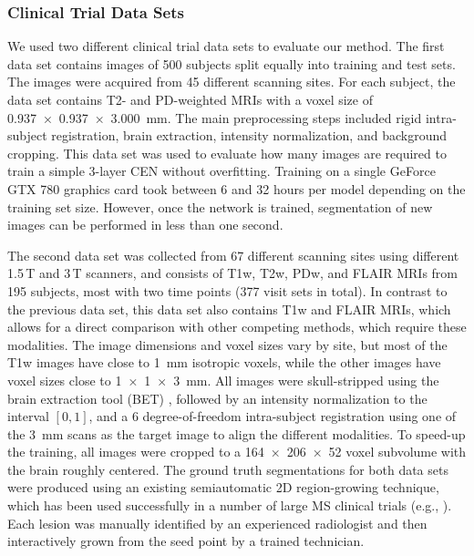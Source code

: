 \subsubsection{Clinical Trial Data Sets}

We used two different clinical trial data sets to evaluate our method. The first
data set contains images of 500 subjects split equally into training and test
sets. The images were acquired from 45 different scanning sites. For each
subject, the data set contains T2- and PD-weighted MRIs with a voxel size of
\SI{0.937x0.937x3.000}{\milli\metre}. The main preprocessing steps included
rigid intra-subject registration, brain extraction, intensity normalization, and
background cropping. This data set was used to evaluate how many images are
required to train a simple 3-layer CEN without overfitting. Training on a
single GeForce GTX 780 graphics card took between 6 and 32 hours per model
depending on the training set size. However, once the network is trained,
segmentation of new images can be performed in less than one second.

The second data set was collected from 67 different scanning sites using
different 1.5\,T and 3\,T scanners, and consists of T1w, T2w, PDw, and FLAIR
MRIs from 195 subjects, most with two time points (377 visit sets in total). In
contrast to the previous data set, this data set also contains T1w and FLAIR
MRIs, which allows for a direct comparison with other competing methods, which
require these modalities. The image dimensions and voxel sizes vary by site, but
most of the T1w images have close to \SI{1}{\milli\meter} isotropic voxels,
while the other images have voxel sizes close to \SI{1x1x3}{\milli\meter}. All
images were skull-stripped using the brain extraction tool (BET)
\citep{jenkinson2005bet2}, followed by an intensity normalization to the
interval $[0,1]$, and a 6 degree-of-freedom intra-subject registration using one
of the \SI{3}{\milli\meter} scans as the target image to align the different
modalities. To speed-up the training, all images were cropped to a
\num{164x206x52} voxel subvolume with the brain roughly centered. The ground
truth segmentations for both data sets were produced using an existing
semiautomatic 2D region-growing technique, which has been used successfully in a
number of large MS clinical trials (e.g.,
\citealp{kappos2006long,traboulsee2008reduction}).
Each lesion was manually identified by an experienced radiologist and then
interactively grown from the seed point by a trained technician.

